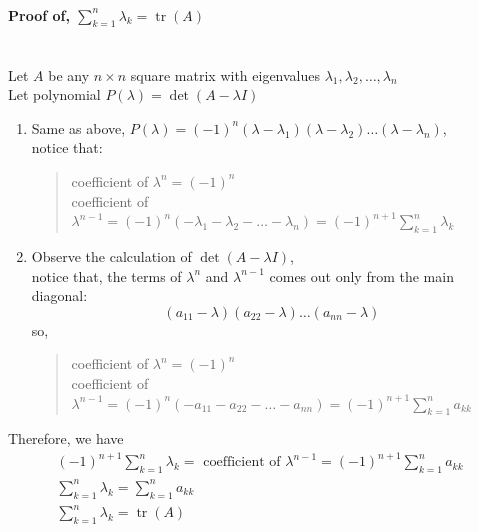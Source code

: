 \documentclass[11pt]{article}
\newcommand{\mymat}[1]{#1}
\begin{document}
    \paragraph{Proof of, $\sum_{k=1}^{n} \lambda_k = \operatorname{tr}(\mymat{A})$}~\vspace{1ex}\\
    Let $\mymat{A}$ be any $n \times n$ square matrix with eigenvalues $\lambda_1, \lambda_2, \dots, \lambda_n$ \\
    Let polynomial $P(\lambda) = \det(\mymat{A} - \lambda\mymat{I})$ 
    \begin{enumerate}
        \item Same as above, $P(\lambda) = (-1)^n(\lambda - \lambda_1)(\lambda - \lambda_2)\dots(\lambda - \lambda_n)$, \\ 
            notice that:
            \begin{quote}
                coefficient of $\lambda^n = (-1)^n$ \\
                coefficient of $\lambda^{n-1} = (-1)^n (-\lambda_1-\lambda_2-\dots-\lambda_n) = (-1)^{n+1} \sum_{k=1}^{n}\lambda_k$
            \end{quote}
        \item Observe the calculation of $\det(\mymat{A}-\lambda\mymat{I})$, \\
            notice that, the terms of $\lambda^n$ and $\lambda^{n-1}$ comes out only from the main diagonal:
            \[ (a_{11} - \lambda)(a_{22} - \lambda)\dots(a_{nn} - \lambda) \]
            so, 
            \begin{quote}
                coefficient of $\lambda^n = (-1)^n$ \\
                coefficient of $\lambda^{n-1} = (-1)^n (-a_{11}-a_{22}-\dots-a_{nn}) = (-1)^{n+1} \sum_{k=1}^{n}a_{kk}$
            \end{quote}
    \end{enumerate}
    Therefore, we have 
    \begin{gather*}
        (-1)^{n+1} \sum_{k=1}^{n}\lambda_k = \text{ coefficient of }\lambda^{n-1} = (-1)^{n+1} \sum_{k=1}^{n}a_{kk} \\
        \sum_{k=1}^{n}\lambda_k = \sum_{k=1}^{n}a_{kk} \\
        \boxed{\sum_{k=1}^{n}\lambda_k = \operatorname{tr}(\mymat{A})}
    \end{gather*}
    
    
    
    

    \newpage
\end{document}
